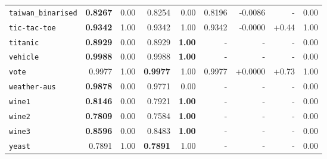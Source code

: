 \begin{tabular}{lrrrrrrrr}
\texttt{taiwan\_binarised} & \textbf{0.8267} & 0.00 & 0.8254 & 0.00 & 0.8196 & -0.0086 & - & 0.00\\
\texttt{tic-tac-toe} & \textbf{0.9342} & 1.00 & 0.9342 & 1.00 & 0.9342 & -0.0000 & +0.44 & 1.00\\
\texttt{titanic} & \textbf{0.8929} & 0.00 & 0.8929 & \textbf{1.00} & - & - & - & 0.00\\
\texttt{vehicle} & \textbf{0.9988} & 0.00 & 0.9988 & \textbf{1.00} & - & - & - & 0.00\\
\texttt{vote} & 0.9977 & 1.00 & \textbf{0.9977} & 1.00 & 0.9977 & +0.0000 & +0.73 & 1.00\\
\texttt{weather-aus} & \textbf{0.9878} & 0.00 & 0.9771 & 0.00 & - & - & - & 0.00\\
\texttt{wine1} & \textbf{0.8146} & 0.00 & 0.7921 & \textbf{1.00} & - & - & - & 0.00\\
\texttt{wine2} & \textbf{0.7809} & 0.00 & 0.7584 & \textbf{1.00} & - & - & - & 0.00\\
\texttt{wine3} & \textbf{0.8596} & 0.00 & 0.8483 & \textbf{1.00} & - & - & - & 0.00\\
\texttt{yeast} & 0.7891 & 1.00 & \textbf{0.7891} & 1.00 & - & - & - & 0.00\\
\bottomrule
\end{tabular}
